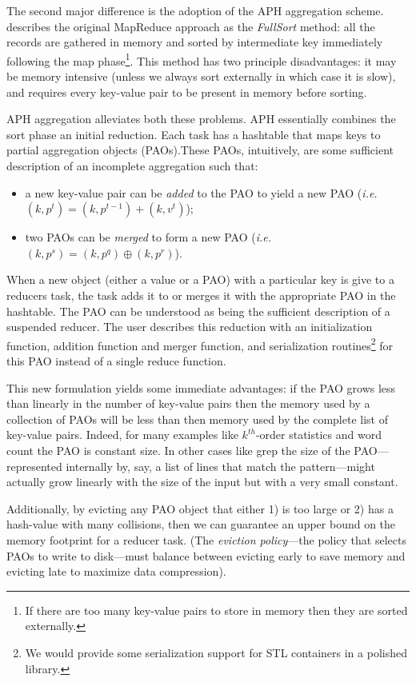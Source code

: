 \documentclass[10pt,letter,final,article,twocolumn]{article} %
\begin{document}
The second major difference is the adoption of the APH aggregation scheme. \citet{yu2009distributed} describes the original MapReduce approach as the \emph{FullSort} method: all the records are gathered in memory and sorted by intermediate key immediately following the map phase\footnote{If there are too many key-value pairs to store in memory then they are sorted externally.}. This method has two principle disadvantages: it may be memory intensive (unless we always sort externally in which case it is slow), and requires every key-value pair to be present in memory before sorting. 

 APH aggregation alleviates both these problems. APH essentially combines the sort phase an initial reduction. Each task has a hashtable that maps keys to partial aggregation objects (PAOs).These PAOs, intuitively, are some sufficient description of an incomplete aggregation such that:
\begin{itemize}
 \item a new key-value pair can be \emph{added} to the PAO to yield a new PAO (\emph{i.e.} $(k,p^t) = (k,p^{t-1}) + (k,v^t)$);
 \item two PAOs can be \emph{merged} to form a new PAO (\emph{i.e.} $(k,p^s) = (k,p^q) \oplus (k,p^r)$).
\end{itemize}
When a new object (either a value or a PAO) with a particular key is give to a reducers task, the task adds it to or merges it with the appropriate PAO in the hashtable. The PAO can be understood as being the sufficient description of a suspended reducer. The user describes this reduction with an initialization function, addition function and merger function, and serialization routines\footnote{We would provide some serialization support for STL containers in a polished library.} for this PAO instead of a single reduce function.

This new formulation yields some immediate advantages: if the PAO grows less than linearly in the number of key-value pairs then the memory used by a collection of PAOs will be less than then memory used by the complete list of key-value pairs. Indeed, for many examples like $k^{th}$-order statistics and word count the PAO is constant size. In other cases like grep the size of the PAO---represented internally by, say, a list of lines that match the pattern---might actually grow linearly with the size of the input but with a very small constant.

Additionally, by evicting any PAO object that either 1) is too large or 2) has a hash-value with many collisions, then we can guarantee an upper bound on the memory footprint for a reducer task. (The \emph{eviction policy}---the policy that selects PAOs to write to disk---must balance between evicting early to save memory and evicting late to maximize data compression).  
\end{document}
